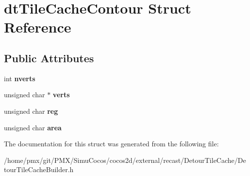 \hypertarget{structdtTileCacheContour}{}\section{dt\+Tile\+Cache\+Contour Struct Reference}
\label{structdtTileCacheContour}
\subsection*{Public Attributes}
\begin{DoxyCompactItemize}
\item 
\mbox{\label{structdtTileCacheContour_a2bb153bf7d141e4ab209a27eeceff55f}} 
int {\bfseries nverts}
\item 
\mbox{\label{structdtTileCacheContour_a3cc26b321212a35487bbb8c1ae0f2c83}} 
unsigned char $\ast$ {\bfseries verts}
\item 
\mbox{\label{structdtTileCacheContour_a71fc05a4f350f018a5ee82c446381d6a}} 
unsigned char {\bfseries reg}
\item 
\mbox{\label{structdtTileCacheContour_a3ab1d658278d4dcc482dcb7f17be6b3b}} 
unsigned char {\bfseries area}
\end{DoxyCompactItemize}


The documentation for this struct was generated from the following file\+:\begin{DoxyCompactItemize}
\item 
/home/pmx/git/\+P\+M\+X/\+Simu\+Cocos/cocos2d/external/recast/\+Detour\+Tile\+Cache/Detour\+Tile\+Cache\+Builder.\+h\end{DoxyCompactItemize}
